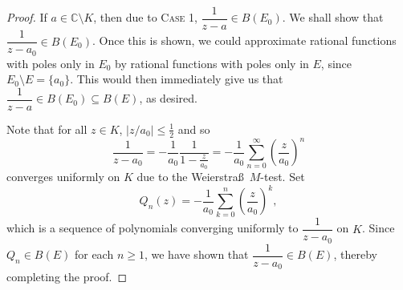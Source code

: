 \documentclass[11pt]{article}
\theoremstyle{thmstyle}
\theoremstyle{defstyle}
\newcommand{\bbC}{\mathbb{C}}
\renewcommand{\le}{\leqslant}
\renewcommand{\ge}{\geqslant}
\begin{document}
\begin{proof}
    If $a\in\bbC\setminus K$, then due to {\scshape Case 1}, $\dfrac{1}{z - a}\in B(E_0)$. We shall show that $\dfrac{1}{z - a_0}\in B(E_0)$. Once this is shown, we could approximate rational functions with poles only in $E_0$ by rational functions with poles only in $E$, since $E_0\setminus E = \{a_0\}$. This would then immediately give us that $\dfrac{1}{z - a}\in B(E_0)\subseteq B(E)$, as desired.

    Note that for all $z\in K$, $|z / a_0|\le\frac{1}{2}$ and so 
    \begin{equation*}
        \frac{1}{z - a_0} = - \frac{1}{a_0}\frac{1}{1 - \frac{z}{a_0}} = -\frac{1}{a_0}\sum_{n = 0}^\infty\left(\frac{z}{a_0}\right)^n
    \end{equation*}
    converges uniformly on $K$ due to the Weierstra\ss\ $M$-test. Set 
    \begin{equation*}
        Q_n(z) = -\frac{1}{a_0}\sum_{k = 0}^n\left(\frac{z}{a_0}\right)^k,
    \end{equation*}
    which is a sequence of polynomials converging uniformly to $\dfrac{1}{z - a_0}$ on $K$. Since $Q_n\in B(E)$ for each $n\ge 1$, we have shown that $\dfrac{1}{z - a_0}\in B(E)$, thereby completing the proof.
\end{proof}
\end{document}
